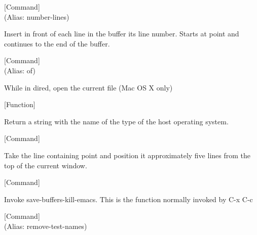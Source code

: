 \vspace{1em}
\noindent
{}
\usebox{\funcname}
 \hfill [Command]\\%
 (Alias: number-lines)

\begin{doc-string}
Insert in front of each line in the buffer its line number.  Starts
at point and continues to the end of the buffer.
\end{doc-string}

\vspace{1em}
\noindent
{}
\usebox{\funcname}
 \hfill [Command]\\%
 (Alias: of)

\begin{doc-string}
While in dired, open the current file (Mac OS X only)
\end{doc-string}

\vspace{1em}
\noindent
{}
\usebox{\funcname}
 \hfill [Function]

\begin{doc-string}
Return a string with the name of the type of the host operating system.
\end{doc-string}

\vspace{1em}
\noindent
{}
\usebox{\funcname}
 \hfill [Command]

\begin{doc-string}
Take the line containing point and position it approximately five lines
from the top of the current window.
\end{doc-string}

\vspace{1em}
\noindent
{}
\usebox{\funcname}
 \hfill [Command]

\begin{doc-string}
Invoke save-buffers-kill-emacs.  This is the function normally
invoked by C-x C-c
\end{doc-string}

\vspace{1em}
\noindent
{}
\usebox{\funcname}
 \hfill [Command]\\%
 (Alias: remove-test-names)

